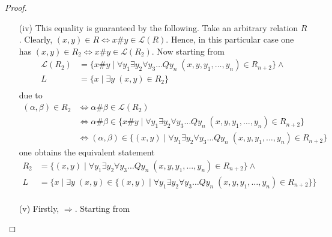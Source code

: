 \documentclass [11pt]{article}
\begin{document}
\begin{proof}
\begin{enumerate}
\item[(iv)] This equality is guaranteed by the following. Take an arbitrary relation $R$. Clearly, $(x,y) \in R \iff x\#y \in \mathcal{L}(R)$. Hence, in this particular case one has $(x,y) \in R_2 \iff x\#y \in \mathcal{L}(R_2)$. Now starting from  
\begin{equation*}
\begin{split}
\mathcal{L}(R_2) &= \{x\#y \mid \forall y_1 \exists y_2\forall y_3\dots Q y_n  \; (x,y,y_1,\ldots,y_n) \in R_{n+2}\}  \land \\ 
L &= \{x \mid \exists y \; (x,y) \in R_2\}  \\ 
\end{split}
\end{equation*}
due to 
 \begin{equation*}
\begin{split}
(\alpha,\beta) \in R_2 &\iff \alpha\#\beta \in\mathcal{L}(R_2) \\
&\iff \alpha\#\beta \in \{ x\#y \mid \forall y_1 \exists y_2\forall y_3\dots Q y_n  \; (x,y,y_1,\ldots,y_n) \in R_{n+2}\}  \\
&\iff (\alpha,\beta) \in \{(x,y) \mid \forall y_1 \exists y_2\forall y_3\dots Q y_n  \; (x,y,y_1,\ldots,y_n) \in R_{n+2}\} 
\end{split}
\end{equation*}
one obtains the equivalent statement
\begin{equation*}
\begin{split}
R_2 &= \{(x,y) \mid \forall y_1 \exists y_2\forall y_3\dots Q y_n  \; (x,y,y_1,\ldots,y_n) \in R_{n+2}\}  \land \\ 
L &= \{x \mid \exists y \; (x,y) \in  \{(x,y) \mid \forall y_1 \exists y_2\forall y_3\dots Q y_n  \; (x,y,y_1,\ldots,y_n) \in R_{n+2}\}\}  \\ 
\end{split}
\end{equation*}



\item[(v)] Firstly, $\Rightarrow$. Starting from 


\end{enumerate}
\end{proof}
\end{document}
